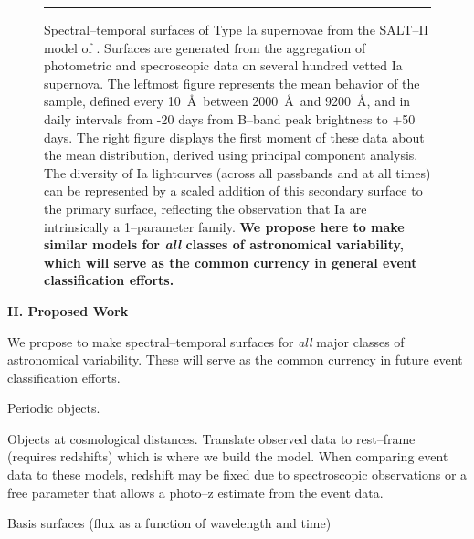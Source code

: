 \begin{figure}[t]
\centerline{ \hfil
{}} \smallskip
\caption[]{\footnotesize Spectral--temporal surfaces of Type Ia supernovae from
the SALT--II model of \cite{2007A&A...466...11G}.  Surfaces are generated from
the aggregation of photometric and specroscopic data on several hundred vetted
Ia supernova.  The leftmost figure represents the mean behavior of the sample,
defined every 10~\AA~between 2000~\AA~and 9200~\AA, and in daily intervals from
-20 days from B--band peak brightness to +50 days.  The right figure displays
the first moment of these data about the mean distribution, derived using
principal component analysis.  The diversity of Ia lightcurves (across all
passbands and at all times) can be represented by a scaled addition of this
secondary surface to the primary surface, reflecting the observation that Ia are
intrinsically a 1--parameter family.  {\bf We propose here to make similar
models for {\it all} classes of astronomical variability, which will serve as
the common currency in general event classification efforts.}} \medskip \hrule
\label{fig:salt2} \end{figure}



\bigskip \centerline{\bf II. Proposed Work} \smallskip

We propose to make spectral--temporal surfaces for {\it all} major classes of
astronomical variability. These will serve as the common currency in future
event classification efforts.

 


Periodic objects.

Objects at cosmological distances.  Translate observed data to rest--frame
(requires redshifts) which is where we build the model.  When comparing event
data to these models, redshift may be fixed due to spectroscopic observations or
a free parameter that allows a photo--z estimate from the event data.

Basis surfaces (flux as a function of wavelength and time)

